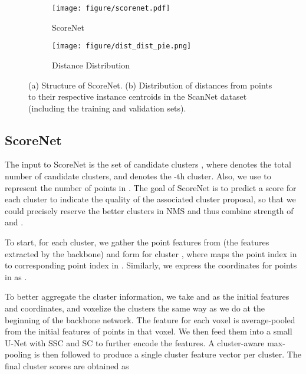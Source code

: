 \documentclass[10pt,twocolumn,letterpaper]{article}
\begin{document}
\begin{figure*}
\begin{subfigure}{.74\textwidth}
		\centering
		\texttt{[image: figure/scorenet.pdf]}
		\caption{ScoreNet}
		\label{fig_scorenet}
	\end{subfigure}
\begin{subfigure}{.24\textwidth}
		\begin{center}
			\texttt{[image: figure/dist\_dist\_pie.png]}
		\end{center}
		\vspace*{-3mm}
		\caption{Distance Distribution}
		\label{fig_dist_dist}
	\end{subfigure}
	\vspace*{-1.5mm}
	\caption{(a) Structure of ScoreNet. (b) Distribution of distances from points to their respective instance centroids in the ScanNet dataset~\cite{dai2017scannet} (including the training and validation sets).}
	\vspace*{-1mm}
\end{figure*}





\subsection{ScoreNet}
\label{sec:score}
The input to ScoreNet is the set of candidate clusters , where  denotes the total number of candidate clusters, and  denotes the -th cluster. Also, we use  to represent the number of points in .
The goal of ScoreNet is to predict a score for each cluster to indicate the quality of the associated cluster proposal, so that we could precisely reserve the better clusters in NMS and thus combine strength of  and .

To start, for each cluster, we gather the point features from  (the features extracted by the backbone) and form  for cluster , where  maps the point index in  to corresponding point index in . Similarly, we express the coordinates for points in  as . 

To better aggregate the cluster information, we take  and  as the initial features and coordinates, and voxelize the clusters the same way as we do at the beginning of the backbone network. The feature for each voxel is average-pooled from the initial features of points in that voxel. We then feed them into a small U-Net with SSC and SC to further encode the features. A cluster-aware max-pooling is then followed to produce a single cluster feature vector  per cluster. The final cluster scores  are obtained as
\end{document}

